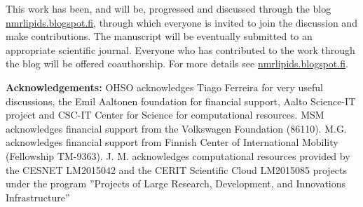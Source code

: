 \documentclass[pre,aps,floatfix,authordate1-4,twocolumn]{revtex4-1}
\begin{document}












This work has been, and will be, progressed and discussed through the blog \url{nmrlipids.blogspot.fi}, through which 
everyone is invited to join the discussion and make contributions. 
The manuscript will be eventually submitted to an appropriate scientific journal. 
Everyone who has contributed to the work through the blog will be offered 
coauthorship. For more details see \url{nmrlipids.blogspot.fi}.   

{\bf Acknowledgements: }
OHSO acknowledges Tiago Ferreira for very useful discussions, the Emil Aaltonen foundation for financial support, Aalto Science-IT project and CSC-IT Center for Science for computational resources. 
%
MSM acknowledges financial support from the Volkswagen Foundation (86110).
%
M.G. acknowledges financial support from Finnish Center of International Mobility (Fellowship TM-9363).
%
J. M. acknowledges computational resources provided by the CESNET LM2015042 and the CERIT Scientific Cloud LM2015085 projects under the program ''Projects of Large Research, Development, and Innovations Infrastructure''
\end{document}
